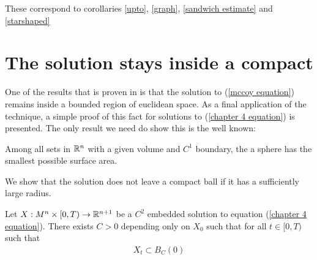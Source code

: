These correspond to corollaries \ref{upto}, \ref{graph}, \ref{sandwich estimate} and \ref{starshaped}
 
\section{The solution stays inside a compact}

One of the results that is proven in \cite{mccoy} is that the solution to (\ref{mccoy equation}) remains inside a bounded region of euclidean space. As a final application of the technique, a simple proof of this fact for solutions to (\ref{chapter 4 equation}) is presented. The only result we need do show this is the well known:
\begin{theorem}
	Among all sets in $\mathbb{R}^n$ with a given volume and $C^1$ boundary, the a sphere has the smallest possible surface area.
\end{theorem} 
We show that the solution does not leave a compact ball if it has a sufficiently large radius.
\begin{comment}
First, we want to prove the following lemma: 
	
	\begin{lemma}
		Let $X:M^n\times [0,T) \rightarrow \R^{n+1}$ be a $C^2$ embedded solution to equation (\ref{chapter 4 equation}), let $\pi$ be a plane. If $X_0 \subset H^-(\pi)$, then it is not possible that $X_t \subset H^+(\pi)$ for all times $t \in [0,T)$\label{cannot cross plane ch4}
	\end{lemma}
	In other words, a solution cannot completely cross from one side of a given plane to the other side.
	\begin{proof}
		Suppose by contradiction that this happens. We can always reflect $X_t$ strictly about $\pi$, by theorem \ref{chow gulliver chapter 4}, because it does not intersect $X_0$. This implies that $X_t^\pi\cap H^-(\pi) \subset \mathrm{int}(X_t)\cap  H^-(\pi)$. But $X_t \subset H^+(\pi)$  implies that $\mathrm{int}(X_t)\cap  H^-(\pi)=\emptyset$ and  $\emptyset \neq X_t^\pi \subset H^-(\pi)$, a contradiction
	\end{proof}
	Finally, we show that the solution does not leave a compact ball if it has a sufficiently large radius. 
\end{comment}
\begin{proposition}
	Let $X:M^n\times [0,T) \rightarrow \mathbb{R}^{n+1}$ be a $C^2$ embedded solution to equation (\ref{chapter 4 equation}). There exists $C>0$ depending only on $X_0$ such that for all $t\in[0, T)$ such that 
	\begin{align*}
		X_t \subset B_C(0)
	\end{align*}
\end{proposition}
